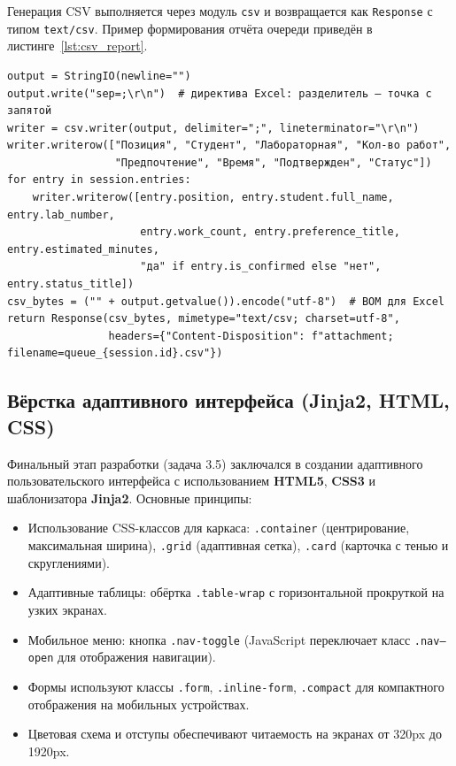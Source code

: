 Генерация CSV выполняется через модуль \texttt{csv} и возвращается как \texttt{Response} с типом \texttt{text/csv}. Пример формирования отчёта очереди приведён в листинге~\ref{lst:csv_report}.

\begin{lstlisting}[caption={Генерация CSV-отчёта очереди}, label={lst:csv_report}]
output = StringIO(newline="")
output.write("sep=;\r\n")  # директива Excel: разделитель — точка с запятой
writer = csv.writer(output, delimiter=";", lineterminator="\r\n")
writer.writerow(["Позиция", "Студент", "Лабораторная", "Кол-во работ",
                 "Предпочтение", "Время", "Подтвержден", "Статус"])
for entry in session.entries:
    writer.writerow([entry.position, entry.student.full_name, entry.lab_number,
                     entry.work_count, entry.preference_title, entry.estimated_minutes,
                     "да" if entry.is_confirmed else "нет", entry.status_title])
csv_bytes = ("﻿" + output.getvalue()).encode("utf-8")  # BOM для Excel
return Response(csv_bytes, mimetype="text/csv; charset=utf-8",
                headers={"Content-Disposition": f"attachment; filename=queue_{session.id}.csv"})
\end{lstlisting}

\subsection{Вёрстка адаптивного интерфейса (Jinja2, HTML, CSS)}

Финальный этап разработки (задача 3.5) заключался в создании адаптивного пользовательского интерфейса с использованием \textbf{HTML5}, \textbf{CSS3} и шаблонизатора \textbf{Jinja2}. Основные принципы:

\begin{itemize}
    \item Использование CSS-классов для каркаса: \texttt{.container} (центрирование, максимальная ширина), \texttt{.grid} (адаптивная сетка), \texttt{.card} (карточка с тенью и скруглениями).
    \item Адаптивные таблицы: обёртка \texttt{.table-wrap} с горизонтальной прокруткой на узких экранах.
    \item Мобильное меню: кнопка \texttt{.nav-toggle} (JavaScript переключает класс \texttt{.nav--open} для отображения навигации).
    \item Формы используют классы \texttt{.form}, \texttt{.inline-form}, \texttt{.compact} для компактного отображения на мобильных устройствах.
    \item Цветовая схема и отступы обеспечивают читаемость на экранах от 320px до 1920px.
\end{itemize}

